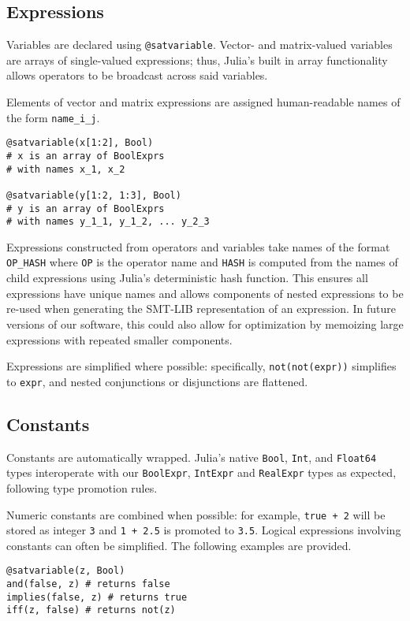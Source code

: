 \documentclass[conference]{IEEEtran}
\begin{document}
\subsection{Expressions}
Variables are declared using \verb|@satvariable|. Vector- and matrix-valued variables are arrays of single-valued expressions; thus, Julia's built in array functionality allows operators to be broadcast across said variables.

Elements of vector and matrix expressions are assigned human-readable names of the form \verb|name_i_j|.
\begin{verbatim}
@satvariable(x[1:2], Bool)
# x is an array of BoolExprs
# with names x_1, x_2

@satvariable(y[1:2, 1:3], Bool)
# y is an array of BoolExprs
# with names y_1_1, y_1_2, ... y_2_3 
\end{verbatim}

Expressions constructed from operators and variables take names of the format \verb|OP_HASH| where \verb|OP| is the operator name and \verb|HASH| is computed from the names of child expressions using Julia's deterministic hash function. This ensures all expressions have unique names and allows components of nested expressions to be re-used when generating the SMT-LIB representation of an expression. In future versions of our software, this could also allow for optimization by memoizing large expressions with repeated smaller components.

Expressions are simplified where possible: specifically, \verb|not(not(expr))| simplifies to \verb|expr|, and nested conjunctions or disjunctions are flattened.

\subsection{Constants}
Constants are automatically wrapped. Julia's native \verb|Bool|, \verb|Int|, and \verb|Float64| types interoperate with our \verb|BoolExpr|, \verb|IntExpr| and \verb|RealExpr| types as expected, following type promotion rules.

Numeric constants are combined when possible: for example, \verb|true + 2| will be stored as integer \verb|3| and \verb|1 + 2.5| is promoted to \verb|3.5|. Logical expressions involving constants can often be simplified. The following examples are provided.
\begin{verbatim}
@satvariable(z, Bool)
and(false, z) # returns false
implies(false, z) # returns true
iff(z, false) # returns not(z)
\end{verbatim}
\end{document}
